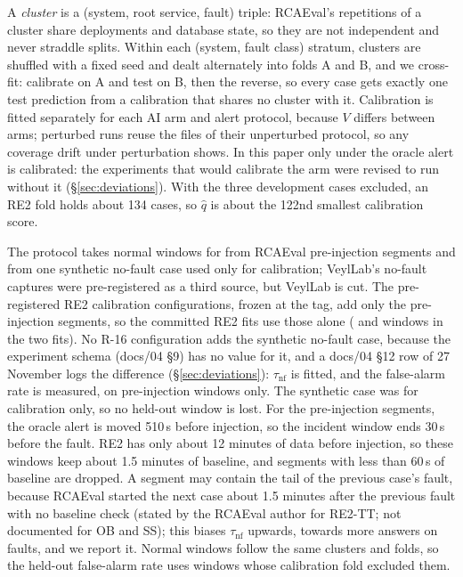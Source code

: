 A \emph{cluster} is a (system, root service, fault) triple: RCAEval's repetitions of a cluster share deployments and database state, so they are not independent and never straddle splits.
Within each (system, fault class) stratum, clusters are shuffled with a fixed seed and dealt alternately into folds A and B, and we cross-fit: calibrate on A and test on B, then the reverse, so every case gets exactly one test prediction from a calibration that shares no cluster with it.
Calibration is fitted separately for each AI arm and alert protocol, because $V$ differs between arms; perturbed runs reuse the files of their unperturbed protocol, so any coverage drift under perturbation shows.
In this paper only  under the oracle alert is calibrated: the experiments that would calibrate the  arm were revised to run without it (\S\ref{sec:deviations}).
With the three development cases excluded, an RE2 fold holds about 134 cases, so $\hat{q}$ is about the 122nd smallest calibration score.

The protocol takes normal windows for \NOFAULT from RCAEval pre-injection segments and from one synthetic no-fault case used only for calibration; VeylLab's no-fault captures were pre-registered as a third source, but VeylLab is cut.
The pre-registered RE2 calibration configurations, frozen at the tag, add only the pre-injection segments, so the committed RE2 fits use those alone ( and  windows in the two fits).
No R-16 configuration adds the synthetic no-fault case, because the experiment schema (docs/04 §9) has no  value for it, and a docs/04 §12 row of 27 November logs the difference (\S\ref{sec:deviations}): $\tau_\text{nf}$ is fitted, and the false-alarm rate is measured, on pre-injection windows only.
The synthetic case was for calibration only, so no held-out window is lost.
For the pre-injection segments, the oracle alert is moved 510\,s before injection, so the incident window ends 30\,s before the fault.
RE2 has only about 12 minutes of data before injection, so these windows keep about 1.5 minutes of baseline, and segments with less than 60\,s of baseline are dropped.
A segment may contain the tail of the previous case's fault, because RCAEval started the next case about 1.5 minutes after the previous fault with no baseline check (stated by the RCAEval author for RE2-TT; not documented for OB and SS); this biases $\tau_\text{nf}$ upwards, towards more \NOFAULT answers on faults, and we report it.
Normal windows follow the same clusters and folds, so the held-out false-alarm rate uses windows whose calibration fold excluded them.

